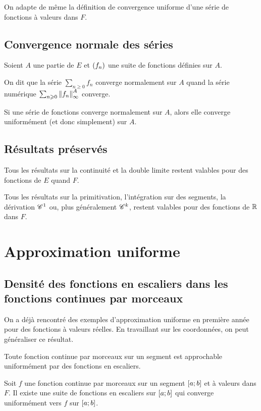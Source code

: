 On adapte de même la définition de convergence uniforme d'une série de fonctions à valeurs dans \(F\).

\subsection{Convergence normale des séries}

\begin{defi}
Soient \(A\) une partie de \(E\) et \(\left(f_n\right)\) une suite de fonctions définies sur \(A\).

On dit que la série \(\sum_{n\geq0}f_n\) converge normalement sur \(A\) quand la série numérique \(\sum_{n\geq0}\norme{f_n}_\infty^A\) converge.
\end{defi}

\begin{theo}
Si une série de fonctions converge normalement sur \(A\), alors elle converge uniformément (et donc simplement) sur \(A\).
\end{theo}

\subsection{Résultats préservés}

Tous les résultats sur la continuité et la double limite restent valables pour des fonctions de \(E\) quand \(F\).

Tous les résultats sur la primitivation, l'intégration sur des segments, la dérivation \(\mathscr{C}^{1}\) ou, plus généralement \(\mathscr{C}^{k}\), restent valables pour des fonctions de \(\mathbb{R}\) dans \(F\).

\section{Approximation uniforme}

\subsection{Densité des fonctions en escaliers dans les fonctions continues par morceaux}

On a déjà rencontré des exemples d'approximation uniforme en première année pour des fonctions à valeurs réelles. En travaillant sur les coordonnées, on peut généraliser ce résultat.

\begin{theo}
Toute fonction continue par morceaux sur un segment est approchable uniformément par des fonctions en escaliers.

Soit \(f\) une fonction continue par morceaux sur un segment \(\left[a;b\right]\) et à valeurs dans \(F\). Il existe une suite de fonctions en escaliers sur \(\left[a;b\right]\) qui converge uniformément vers \(f\) sur \(\left[a;b\right]\).
\end{theo}

